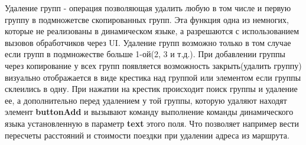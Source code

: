 \documentclass[../index.tex]{subfiles}
\begin{document}
Удаление групп - операция позволяющая удалить любую в том числе и первую группу в подмножетсве скопированных групп. Эта функция одна из немногих, которые не реализованы в динамическом языке, а разрешаются с использованием вызовов обработчиков через UI.
Удаление групп возможно только в том случае если групп в подмножестве больше 1-ой(2, 3 и т.д.). При добавлении группы через копирование у всех групп появляется возможность закрыть(удалить группу) визуально отображается в виде крестика над группой или элементом если группы склеились в одну.
При нажатии на крестик происходит поиск группы и удаление ее, а дополнительно перед удалением у той группы, которую удаляют находят элемент \textbf{buttonAdd} и вызывают команду выполнение команды динамического языка установленную в параметр \textbf{text} этого поля. Что позволяет например вести пересчеты расстояний и стоимости поездки при удалении адреса из маршрута.
\end{document}
